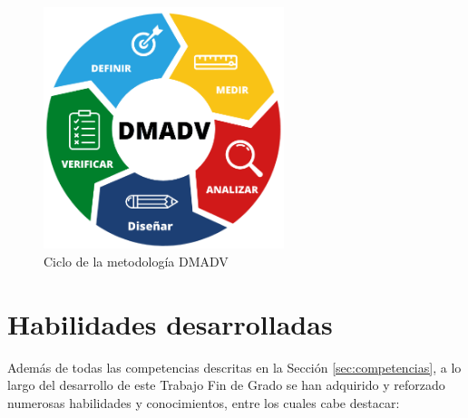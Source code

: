 \begin{figure} [H]
    \begin{center}
      \includegraphics[width=7cm]{figs/DMADV.png}
    \end{center}
    \caption{Ciclo de la metodología DMADV}
    \label{fig:DMADV}
\end{figure}

\section{Habilidades desarrolladas}
\label{sec:habilidades_desarrolladas}

Además de todas las competencias descritas en la Sección \ref{sec:competencias}, a lo largo del desarrollo de este Trabajo Fin de Grado se han adquirido y reforzado numerosas habilidades y conocimientos, entre los cuales cabe destacar:

